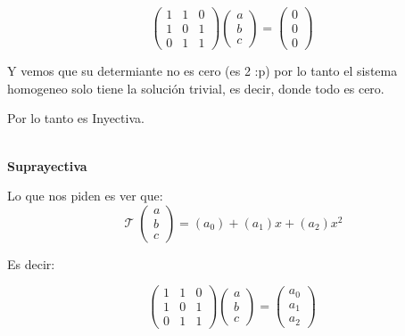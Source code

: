 \documentclass[12pt]{report}                                    %
\DeclareMathOperator \LinealTransformation {\mathcal{T}}
\begin{document}
            \begin{equation*}
            \begin{pmatrix}1&1&0\\1&0&1\\0&1&1\end{pmatrix}
                \begin{pmatrix}a\\b\\c\end{pmatrix}=
                \begin{pmatrix}0\\0\\0\end{pmatrix}
            \end{equation*}

            Y vemos que su determiante no es cero (es 2 :p) por lo tanto el sistema homogeneo solo
            tiene la solución trivial, es decir, donde todo es cero.

            Por lo tanto es Inyectiva.

            \textbf{\\Suprayectiva}

            Lo que nos piden es ver que:
            \begin{equation*}
                \LinealTransformation(\begin{matrix}a\\b\\c\end{matrix}) = (a_0) +(a_1)x+(a_2)x^2
            \end{equation*}

            Es decir:

            \begin{equation*}
                \begin{pmatrix}1&1&0\\1&0&1\\0&1&1\end{pmatrix}
                \begin{pmatrix}a\\b\\c\end{pmatrix}
                =
                \begin{pmatrix}a_0\\a_1\\a_2\end{pmatrix}
            \end{equation*}
\end{document}
